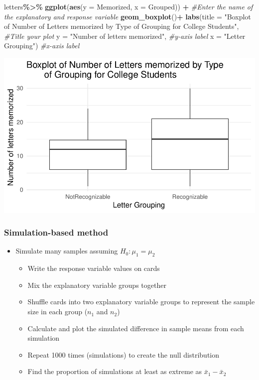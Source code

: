 \documentclass[
]{report}
\newenvironment{Shaded}{\begin{snugshade}}{\end{snugshade}}
\newcommand{\AttributeTok}[1]{\textcolor[rgb]{0.13,0.29,0.53}{#1}}
\newcommand{\CommentTok}[1]{\textcolor[rgb]{0.56,0.35,0.01}{\textit{#1}}}
\newcommand{\FunctionTok}[1]{\textcolor[rgb]{0.13,0.29,0.53}{\textbf{#1}}}
\newcommand{\NormalTok}[1]{#1}
\newcommand{\SpecialCharTok}[1]{\textcolor[rgb]{0.81,0.36,0.00}{\textbf{#1}}}
\newcommand{\StringTok}[1]{\textcolor[rgb]{0.31,0.60,0.02}{#1}}
\begin{document}
\begin{Shaded}
\begin{Highlighting}[]
\NormalTok{letters}\SpecialCharTok{\%\textgreater{}\%}
  \FunctionTok{ggplot}\NormalTok{(}\FunctionTok{aes}\NormalTok{(}\AttributeTok{y =}\NormalTok{ Memorized, }\AttributeTok{x =}\NormalTok{ Grouped))  }\SpecialCharTok{+} \CommentTok{\#Enter the name of the explanatory and response variable}
  \FunctionTok{geom\_boxplot}\NormalTok{()}\SpecialCharTok{+}
  \FunctionTok{labs}\NormalTok{(}\AttributeTok{title =} \StringTok{"Boxplot of Number of Letters memorized by Type }
\StringTok{       of Grouping for College Students"}\NormalTok{, }\CommentTok{\#Title your plot}
       \AttributeTok{y =} \StringTok{"Number of letters memorized"}\NormalTok{, }\CommentTok{\#y{-}axis label}
       \AttributeTok{x =} \StringTok{"Letter Grouping"}\NormalTok{) }\CommentTok{\#x{-}axis label}
\end{Highlighting}
\end{Shaded}

\begin{center}\includegraphics[width=0.6\linewidth]{12-VN12-1ofeach_files/figure-latex/unnamed-chunk-2-1} \end{center}

\subsubsection*{Simulation-based method}\label{simulation-based-method-8}

\begin{itemize}
\item
  Simulate many samples assuming \(H_0: \mu_1 = \mu_2\)

  \begin{itemize}
  \item
    Write the response variable values on cards
  \item
    Mix the explanatory variable groups together
  \item
    Shuffle cards into two explanatory variable groups to represent the sample size in each group (\(n_1\) and \(n_2\))
  \item
    Calculate and plot the simulated difference in sample means from each simulation
  \item
    Repeat 1000 times (simulations) to create the null distribution
  \item
    Find the proportion of simulations at least as extreme as \(\bar{x}_1 - \bar{x}_2\)
  \end{itemize}
\end{itemize}
\end{document}
